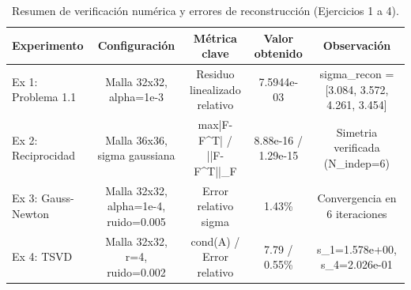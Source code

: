 \begin{table}[htbp]
\centering
\caption{Resumen de verificación numérica y errores de reconstrucción (Ejercicios 1 a 4).}
\label{tab:resumen_verificacion}
\begin{tabular}{lcccc}
\hline
Experimento & Configuración & Métrica clave & Valor obtenido & Observación \\
\hline
Ex 1: Problema 1.1 & Malla 32x32, alpha=1e-3 & Residuo linealizado relativo & 7.5944e-03 & sigma\_recon = [3.084, 3.572, 4.261, 3.454] \\
Ex 2: Reciprocidad & Malla 36x36, sigma gaussiana & max|F-F^T| / ||F-F^T||\_F & 8.88e-16 / 1.29e-15 & Simetria verificada (N\_indep=6) \\
Ex 3: Gauss-Newton & Malla 32x32, alpha=1e-4, ruido=0.005 & Error relativo sigma & 1.43\% & Convergencia en 6 iteraciones \\
Ex 4: TSVD & Malla 32x32, r=4, ruido=0.002 & cond(A) / Error relativo & 7.79 / 0.55\% & s\_1=1.578e+00, s\_4=2.026e-01 \\
\hline
\end{tabular}
\end{table}
